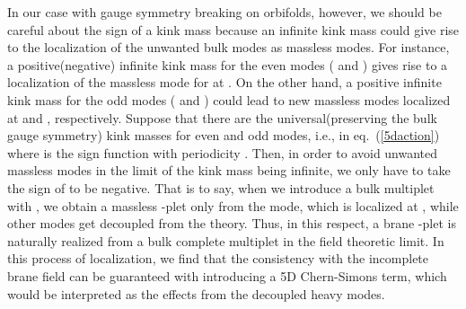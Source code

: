 \documentclass[a4paper,12pt]{article}
\begin{document}
In our case with gauge symmetry breaking on orbifolds, however,
we should be careful about the sign of a kink mass because an infinite kink 
mass could give rise to the localization of the unwanted bulk modes 
as massless modes\cite{barbieri,pomarol,hebecker}. For instance, 
a positive(negative) infinite kink mass for the even modes 
(\myHighlight{$(+,+)$}\coordHE{} and \myHighlight{$(-,-)$}\coordHE{}) 
gives rise to a localization of the massless mode for \myHighlight{$(+,+)$}\coordHE{} 
at \coordHE{}. 
On the other hand, 
a positive infinite kink mass for the odd modes (\myHighlight{$(+,-)$}\coordHE{} and \myHighlight{$(-,+)$}\coordHE{}) 
could lead to new massless modes localized at \coordHE{} and \coordHE{}, 
respectively. 
Suppose that there are the universal(preserving the bulk gauge symmetry) 
kink masses for even and odd modes, i.e., 
\coordHE{} in eq.~(\ref{5daction}) 
where \coordHE{} is the sign function with periodicity \coordHE{}. 
Then, in order to avoid unwanted massless modes in the limit of the kink mass 
being infinite, we only have to take the sign of \coordHE{} to be negative. 
That is to say, when we introduce a bulk multiplet \coordHE{} 
with \coordHE{}, 
we obtain a massless \coordHE{}-plet only from the \myHighlight{$(+,+)$}\coordHE{} mode, 
which is localized at \coordHE{}, while other modes get decoupled 
from the theory. 
Thus, in this respect, a brane \coordHE{}-plet is naturally realized from a bulk 
complete multiplet in the field theoretic limit. 
In this process of localization, we find that 
the consistency with the incomplete brane field can be guaranteed 
with introducing a 5D Chern-Simons term\cite{kkl}, 
which would be interpreted as the 
effects from the decoupled heavy modes\cite{ch,ah,pilo}. 
\end{document}
